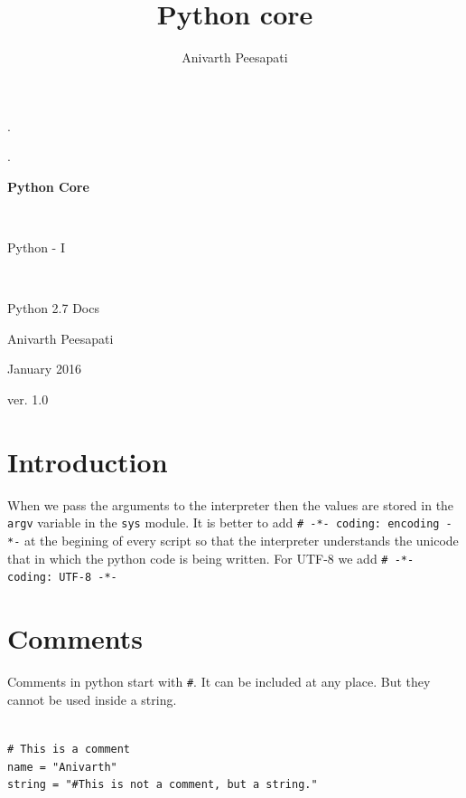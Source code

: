 \documentclass[12pt,a4paper]{article}
\title{Python core}
\author{Anivarth Peesapati}
\begin{document}
\begin{flushleft}
.
\end{flushleft}
\begin{flushright}
.
\end{flushright}
\vspace{7cm}
\begin{center}
\begin{Huge}
\textbf{Python Core}
\end{Huge}
\\

\begin{huge}
Python - I
\end{huge}
\\
\begin{normalsize}
Python 2.7 Docs
\end{normalsize}
\end{center}
\begin{flushright}
\begin{LARGE}
Anivarth Peesapati
\end{LARGE}

\begin{large}
January 2016
\end{large}

\begin{normalsize}
ver. 1.0
\end{normalsize}
\end{flushright}
\clearpage
\tableofcontents\clearpage
\section{Introduction}
When we pass the arguments to the interpreter then the values are stored in the \texttt{argv} variable in the  \texttt{sys} module. It is better to add \texttt{\# -*- coding: encoding -*-} at the begining of every script so that the interpreter understands the unicode that in which the python code is being written. For UTF-8 we add \texttt{\# -*- coding: UTF-8 -*-}
\section{Comments}

Comments in python start with \texttt{\#}. It can be included at any place. But they cannot be used inside a string. 

\texttt{\\
\# This is a comment\\
name = "Anivarth"\\
string = "\#This is not a comment, but a string."
}
\end{document}
